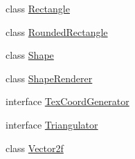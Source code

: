 \begin{DoxyCompactItemize}
class \mbox{\hyperlink{classorg_1_1newdawn_1_1slick_1_1geom_1_1_rectangle}{Rectangle}}
\item 
class \mbox{\hyperlink{classorg_1_1newdawn_1_1slick_1_1geom_1_1_rounded_rectangle}{Rounded\+Rectangle}}
\item 
class \mbox{\hyperlink{classorg_1_1newdawn_1_1slick_1_1geom_1_1_shape}{Shape}}
\item 
class \mbox{\hyperlink{classorg_1_1newdawn_1_1slick_1_1geom_1_1_shape_renderer}{Shape\+Renderer}}
\item 
interface \mbox{\hyperlink{interfaceorg_1_1newdawn_1_1slick_1_1geom_1_1_tex_coord_generator}{Tex\+Coord\+Generator}}
\item 
interface \mbox{\hyperlink{interfaceorg_1_1newdawn_1_1slick_1_1geom_1_1_triangulator}{Triangulator}}
\item 
class \mbox{\hyperlink{classorg_1_1newdawn_1_1slick_1_1geom_1_1_vector2f}{Vector2f}}
\end{DoxyCompactItemize}
